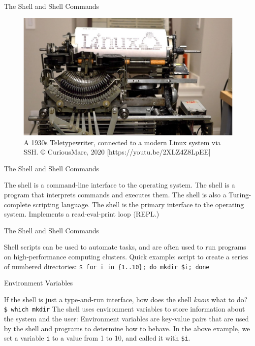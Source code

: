 \documentclass[aspectratio=169]{beamer}
\begin{document}
    \begin{frame}{The Shell and Shell Commands}
        \begin{figure}[H]
            \centering
            \includegraphics[width=0.70\linewidth]{tty}
            \caption{A 1930s Teletypewriter, connected to a modern Linux system via SSH. © CuriousMarc, 2020 [https://youtu.be/2XLZ4Z8LpEE]}
        \end{figure}
    \end{frame}

    \begin{frame}{The Shell and Shell Commands}
        \begin{outline}
            \1 The shell is a command-line interface to the operating system.
                \2 The shell is a program that interprets commands and executes them.
                \2 The shell is also a Turing-complete scripting language.
            \1 The shell is the primary interface to the operating system.
                \2 Implements a read-eval-print loop (REPL.) 
        \end{outline}
    \end{frame}

    \begin{frame}{The Shell and Shell Commands}
        \begin{outline}
            \1 Shell scripts can be used to automate tasks, and are often used to run programs on high-performance computing clusters.
            \1 Quick example: script to create a series of numbered directories: 
            \0 \texttt{\$ for i in \{1..10\}; do mkdir \$i; done}
        \end{outline}
    \end{frame}

    \begin{frame}{Environment Variables} 
        \begin{outline}
            \1 If the shell is just a type-and-run interface, how does the shell \textit{know} what to do?
                \2 \texttt{\$ which mkdir} 
            \1 The shell uses environment variables to store information about the system and the user:
                \2 Environment variables are key-value pairs that are used by the shell and programs to determine how to behave.
                \2 In the above example, we set a variable \texttt{i} to a value from 1 to 10, and called it with \texttt{\$i}.
        \end{outline}
    \end{frame}
\end{document}
